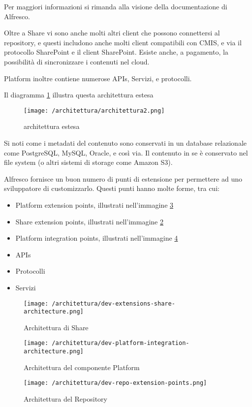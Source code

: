 Per maggiori informazioni si rimanda alla visione della documentazione di Alfresco.

Oltre a Share vi sono anche molti altri client che possono connettersi al repository, e questi includono anche molti client compatibili con CMIS, e via il protocollo SharePoint e il client SharePoint. Esiste anche, a pagamento, la possibilità di sincronizzare i contenuti nel cloud.

Platform inoltre contiene numerose APIs, Servizi, e protocolli.

Il diagramma \ref{fig:architettura-estesa} illustra questa architettura estesa

\begin{figure}[!ht]
\centering
\texttt{[image: /architettura/architettura2.png]}
\caption{architettura estesa\label{fig:architettura-estesa}}
\end{figure}

Si noti come i metadati del contenuto sono conservati in un database relazionale come PostgreSQL, MySQL, Oracle, e così via. Il contenuto in se è conservato nel file system (o altri sistemi di storage come Amazon S3).

Alfresco fornisce un buon numero di punti di estensione per permettere ad uno sviluppatore di customizzarlo. Questi punti hanno molte forme, tra cui:
\begin{itemize}
\item Platform extension points, illustrati nell'immagine \ref{fig:dev-platform-integration-architecture.png}
\item Share extension points, illustrati nell'immagine \ref{fig:dev-extensions-share-architecture}
\item Platform integration points, illustrati nell'immagine \ref{fig:dev-repo-extension-points.png}
\item APIs
\item Protocolli
\item Servizi
\end{itemize}
\begin{figure}[!ht]
\centering
\texttt{[image: /architettura/dev-extensions-share-architecture.png]}
\caption{Architettura di Share\label{fig:dev-extensions-share-architecture}}
\end{figure}
\begin{figure}[!ht]
\centering
\texttt{[image: /architettura/dev-platform-integration-architecture.png]}
\caption{Architettura del componente Platform\label{fig:dev-platform-integration-architecture.png}}
\end{figure}
\begin{figure}[!ht]
\centering
\texttt{[image: /architettura/dev-repo-extension-points.png]}
\caption{Architettura del Repository\label{fig:dev-repo-extension-points.png}}
\end{figure}
